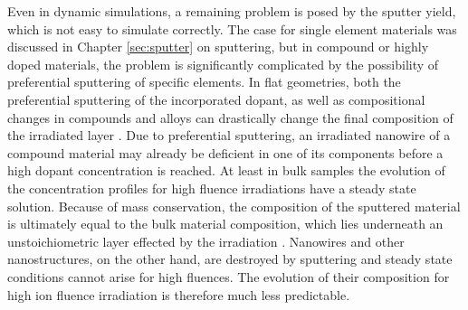 Even in dynamic simulations, a remaining problem is posed by the sputter yield, which is not easy to simulate correctly. The case for single element materials was discussed in Chapter \ref{sec:sputter} on sputtering, but in compound or highly doped materials, the problem is significantly complicated by the possibility of preferential sputtering of specific elements. In flat geometries, both the preferential sputtering of the incorporated dopant, as well as compositional changes in compounds and alloys can drastically change the final composition of the irradiated layer \cite{kelly_attempt_1978,moller_tridyn_1984,andersen_computer_1986,moller_tridyn-binary_1988,sigmund_alloy_1993,zaporozchenko_preferential_1995}. Due to preferential sputtering, an irradiated nanowire of a compound material may already be deficient in one of its components before a high dopant concentration is reached. At least in bulk samples the evolution of the concentration profiles for high fluence irradiations have a steady state solution. Because of mass conservation, the composition of the sputtered material is ultimately equal to the bulk material composition, which lies underneath an unstoichiometric layer effected by the irradiation \cite{andersen_computer_1986}. Nanowires and other nanostructures, on the other hand, are destroyed by sputtering and steady state conditions cannot arise for high fluences. The evolution of their composition for high ion fluence irradiation is therefore much less predictable.
\addtolength{\textheight}{-1cm}
\vfill